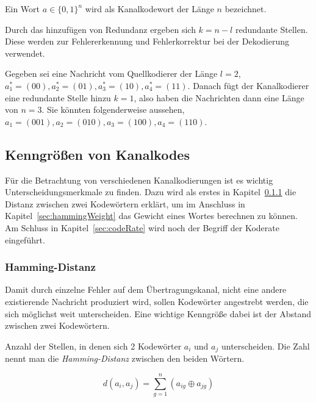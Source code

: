 \begin{t_def}
Ein Wort $a \in \{0,1\}^n$ wird als Kanalkodewort der Länge $n$ bezeichnet.
\end{t_def} 

Durch das hinzufügen von Redundanz ergeben sich $k = n - l$ redundante Stellen. Diese werden zur Fehlererkennung und Fehlerkorrektur bei der Dekodierung verwendet.

\begin{e_exa}
Gegeben sei eine Nachricht vom Quellkodierer der Länge $l=2$, $a^*_{1}=(00),a^*_{2}=(01),a^*_{3}=(10),a^*_{4}=(11)$. Danach fügt der Kanalkodierer eine redundante Stelle hinzu $k=1$, also haben die Nachrichten dann eine Länge von $n=3$. Sie könnten folgenderweise aussehen, $a_{1}=(001),a_{2}=(010),a_{3}=(100),a_{4}=(110)$.
\end{e_exa}

\subsection{Kenngrößen von Kanalkodes}
\label{sec:channelParameters}
Für die Betrachtung von verschiedenen Kanalkodierungen ist es wichtig Unterscheidungsmerkmale zu finden. Dazu wird als erstes in Kapitel~\ref{sec:hammingDistance} die Distanz zwischen zwei Kodewörtern erklärt, um im Anschluss in Kapitel~\ref{sec:hammingWeight} das Gewicht eines Wortes berechnen zu können. Am Schluss in Kapitel~\ref{sec:codeRate} wird noch der Begriff der Koderate eingeführt.

\subsubsection{Hamming-Distanz}
\label{sec:hammingDistance}
Damit durch einzelne Fehler auf dem Übertragungskanal, nicht eine andere existierende Nachricht produziert wird, sollen Kodewörter angestrebt werden, die sich möglichst weit unterscheiden. Eine wichtige Kenngröße dabei ist der Abstand zwischen zwei Kodewörtern.

\begin{t_def}
Anzahl der Stellen, in denen sich 2 Kodewörter $a_i$ und $a_j$ unterscheiden. Die Zahl nennt man die \emph{Hamming-Distanz} zwischen den beiden Wörtern.
\end{t_def} 
 
\begin{equation}
d(a_i,a_j) = \sum^{n}_{g=1} (a_{ig} \oplus a_{jg})
\label{eq:hammingDistance}
\end{equation}

